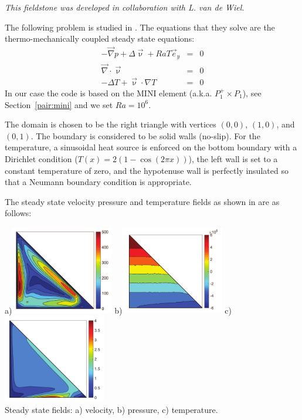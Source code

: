 {\sl This fieldstone was developed in collaboration with L. van de Wiel}. 


The following problem is studied in \cite{jolm17}. The equations that they solve are the thermo-mechanically coupled steady state equations:
\begin{eqnarray}
-\vec{\nabla}p + \Delta \vec{\upnu} + Ra T \vec{e}_y &=& 0\\
\vec\nabla\cdot\vec\upnu &=& 0 \\
-\Delta T + \vec\upnu\cdot\nabla T &=& 0
\end{eqnarray}
In our case the code is based on the MINI element (a.k.a. $P_1^+ \times P_1$), see Section~\ref{pair:mini}
and we set $Ra=10^6$.

The domain is chosen to be the right triangle
with vertices $(0,0)$, $(1,0)$, and $(0,1)$. 
The boundary is considered to be solid walls (no-slip).
For the temperature, a sinusoidal heat source is enforced on the bottom
boundary with a Dirichlet condition ($T(x)=2(1-\cos (2\pi x))$), 
the left wall is set to a constant temperature
of zero, and the hypotenuse wall is perfectly insulated so that a Neumann 
boundary condition is appropriate.

The steady state velocity pressure and temperature fields as shown in 
\cite{jolm17} are as follows:

\begin{center}
a)\includegraphics[width=4.5cm]{python_codes/fieldstone_51/images/jolm17_vel}
b)\includegraphics[width=4.5cm]{python_codes/fieldstone_51/images/jolm17_p}
c)\includegraphics[width=4.5cm]{python_codes/fieldstone_51/images/jolm17_T}\\
{\small Steady state fields: a) velocity, b) pressure, c) temperature.}
\end{center}

